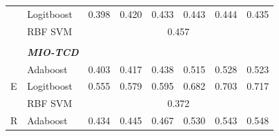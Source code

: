 \documentclass[12pt]{article}
\begin{document}
\begin{sloppypar}
\begin{table}[hbt!]
\begin{tabular}{lllllllll}
                                       & \multicolumn{2}{l}{Logitboost}                            & 0.398                           & 0.420                            & 0.433                            & 0.443                           & 0.444                            & 0.435                            \\
                                       & \multicolumn{2}{l}{RBF SVM}                               & \multicolumn{6}{c}{0.457}                                                                                                                                                                                     \\
                                       &                 &                                         &                                 &                                  &                                  &                                 &                                  &                                  \\
                                       & \multicolumn{2}{l}{\textit{\textbf{MIO-TCD}}}             &                                 &                                  &                                  &                                 &                                  &                                  \\
\multirow{3}{*}{E}                     & \multicolumn{2}{l}{Adaboost}                              & 0.403                           & 0.417                            & 0.438                            & 0.515                           & 0.528                            & 0.523                            \\
                                       & \multicolumn{2}{l}{Logitboost}                            & 0.555                           & 0.579                            & 0.595                            & 0.682                           & 0.703                            & 0.717                            \\
                                       & \multicolumn{2}{l}{RBF SVM}                               & \multicolumn{6}{c}{0.372}                                                                                                                                                                                     \\
\multirow{3}{*}{R}                     & \multicolumn{2}{l}{Adaboost}                              & 0.434                           & 0.445                            & 0.467                            & 0.530                           & 0.543                            & 0.548                            \\

\end{tabular}
\end{table}
\end{sloppypar}
\end{document}

